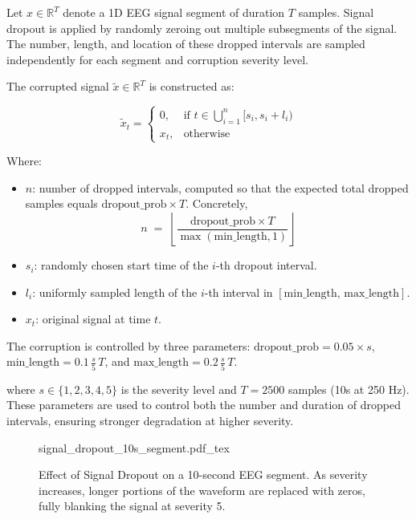 Let \( x \in \mathbb{R}^T \) denote a 1D EEG signal segment of duration \( T \) samples. Signal dropout is applied by randomly zeroing out multiple subsegments of the signal. The number, length, and location of these dropped intervals are sampled independently for each segment and corruption severity level.

The corrupted signal \( \tilde{x} \in \mathbb{R}^T \) is constructed as:

\begin{equation}
\tilde{x}_t = 
\begin{cases}
0, & \text{if } t \in \bigcup_{i=1}^{n} [s_i, s_i + l_i) \\
x_t, & \text{otherwise}
\end{cases}
\end{equation}

\noindent Where:
\begin{itemize}
  \item $n$: number of dropped intervals, computed so that the expected total dropped samples equals $\text{dropout\_prob}\times T$.  Concretely,
  \begin{equation}
      n \;=\;\left\lfloor\frac{\text{dropout\_prob}\times T}{\max(\text{min\_length},1)}\right\rfloor
  \end{equation}
  \item $s_i$: randomly chosen start time of the $i$-th dropout interval.
  \item $l_i$: uniformly sampled length of the $i$-th interval in $[\text{min\_length},\,\text{max\_length}]$.
  \item $x_t$: original signal at time $t$.
\end{itemize}

The corruption is controlled by three parameters: 
$\text{dropout\_prob} = 0.05 \times s$,  $\text{min\_length} = 0.1 \,\frac{s}{5}\,T$, and $\text{max\_length} = 0.2 \,\frac{s}{5}\,T$.

\noindent where \( s \in \{1, 2, 3, 4, 5\} \) is the severity level and \( T = 2500 \) samples (10s at 250 Hz). These parameters are used to control both the number and duration of dropped intervals, ensuring stronger degradation at higher severity.
\begin{figure}[h]
	\centering
    \def\svgwidth{420pt}
 	{signal_dropout_10s_segment.pdf_tex} 	 	
	\caption[Effect of signal dropout on a 10-second EEG segment]{Effect of Signal Dropout on a 10-second EEG segment. As severity increases, longer portions of the waveform are replaced with zeros, fully blanking the signal at severity 5.}
	\label{fig:signal_dropout}
\end{figure}


